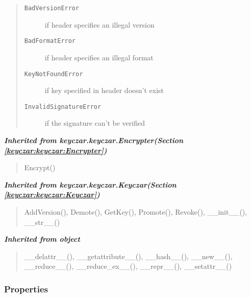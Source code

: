 \begin{boxedminipage}{\funcwidth}
\begin{quote}
\begin{description}
          \item[\texttt{BadVersionError}]

          if header specifies an illegal version

          \item[\texttt{BadFormatError}]

          if header specifies an illegal format

          \item[\texttt{KeyNotFoundError}]

          if key specified in header doesn't exist

          \item[\texttt{InvalidSignatureError}]

          if the signature can't be verified

        \end{description}

      \end{quote}

    \end{boxedminipage}


\large{\textbf{\textit{Inherited from keyczar.keyczar.Encrypter\textit{(Section \ref{keyczar:keyczar:Encrypter})}}}}

\begin{quote}
Encrypt()
\end{quote}

\large{\textbf{\textit{Inherited from keyczar.keyczar.Keyczar\textit{(Section \ref{keyczar:keyczar:Keyczar})}}}}

\begin{quote}
AddVersion(), Demote(), GetKey(), Promote(), Revoke(), \_\_init\_\_(), \_\_str\_\_()
\end{quote}

\large{\textbf{\textit{Inherited from object}}}

\begin{quote}
\_\_delattr\_\_(), \_\_getattribute\_\_(), \_\_hash\_\_(), \_\_new\_\_(), \_\_reduce\_\_(), \_\_reduce\_ex\_\_(), \_\_repr\_\_(), \_\_setattr\_\_()
\end{quote}


  \subsubsection{Properties}

